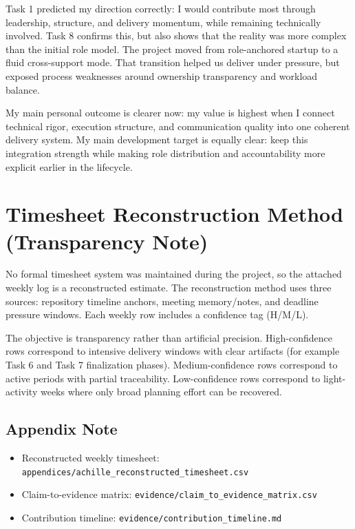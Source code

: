 \noindent Task 1 predicted my direction correctly: I would contribute most through leadership, structure, and delivery momentum, while remaining technically involved. Task 8 confirms this, but also shows that the reality was more complex than the initial role model. The project moved from role-anchored startup to a fluid cross-support mode. That transition helped us deliver under pressure, but exposed process weaknesses around ownership transparency and workload balance.


\noindent My main personal outcome is clearer now: my value is highest when I connect technical rigor, execution structure, and communication quality into one coherent delivery system. My main development target is equally clear: keep this integration strength while making role distribution and accountability more explicit earlier in the lifecycle.


\chapter{Timesheet Reconstruction Method (Transparency Note)}


\noindent No formal timesheet system was maintained during the project, so the attached weekly log is a reconstructed estimate. The reconstruction method uses three sources: repository timeline anchors, meeting memory/notes, and deadline pressure windows. Each weekly row includes a confidence tag (H/M/L).


\noindent The objective is transparency rather than artificial precision. High-confidence rows correspond to intensive delivery windows with clear artifacts (for example Task 6 and Task 7 finalization phases). Medium-confidence rows correspond to active periods with partial traceability. Low-confidence rows correspond to light-activity weeks where only broad planning effort can be recovered.




\section{Appendix Note}


\begin{itemize}[leftmargin=1.5em]
\item Reconstructed weekly timesheet: \texttt{appendices/achille\_reconstructed\_timesheet.csv}
\item Claim-to-evidence matrix: \texttt{evidence/claim\_to\_evidence\_matrix.csv}
\item Contribution timeline: \texttt{evidence/contribution\_timeline.md}
\end{itemize}
